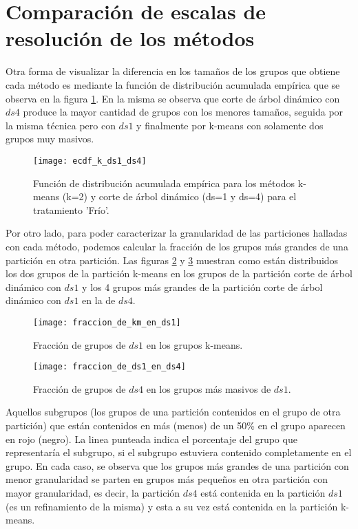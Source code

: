 \section{Comparación de escalas de resolución de los métodos}
Otra forma de visualizar la diferencia en los tamaños de los grupos que obtiene cada método es mediante la función de distribución acumulada empírica que se observa en la figura \ref{fig:ecdf_k_ds1_ds4}. En la misma se observa que corte de árbol dinámico con $ds4$ produce la mayor cantidad de grupos con los menores tamaños, seguida por la misma técnica pero con $ds1$ y finalmente por k-means con solamente dos grupos muy masivos.
\begin{figure}[h]
    \centering
    \texttt{[image: ecdf\_k\_ds1\_ds4]}
    \caption{Función de distribución acumulada empírica para los métodos k-means (k=2) y corte de árbol dinámico (ds=1 y ds=4) para el tratamiento 'Frío'.}
    \label{fig:ecdf_k_ds1_ds4}
\end{figure}
Por otro lado, para poder caracterizar la granularidad de las particiones halladas con cada método, podemos calcular la fracción de los grupos más grandes de una partición en otra partición. Las figuras \ref{fig:fraccion_de_km_en_ds1} y \ref{fig:fraccion_de_ds1_en_ds4} muestran como están distribuidos los dos grupos de la partición k-means en los grupos de la partición corte de árbol dinámico con $ds1$ y los 4 grupos más grandes de la partición corte de árbol dinámico con $ds1$ en la de $ds4$.
\begin{figure*}[t!]
    \centering
    \begin{subfigure}[t]{0.5\textwidth}
    \centering
    \texttt{[image: fraccion\_de\_km\_en\_ds1]}
    \caption{Fracción de grupos de $ds1$ en los grupos k-means.}
    \label{fig:fraccion_de_km_en_ds1}
    \end{subfigure}

    \begin{subfigure}[t]{0.8\textwidth}
    \centering
    \texttt{[image: fraccion\_de\_ds1\_en\_ds4]}
    \caption{Fracción de grupos de $ds4$ en los grupos más masivos de $ds1$.}
    \label{fig:fraccion_de_ds1_en_ds4}
    \end{subfigure}
    \caption{Fracción de grupos de una partición más fina dentro de grupos en una partición más gruesa para el tratamiento 'Frío', con $ds1$, $ds4$ y k-means. En rojo, aquellos subgrupos que están contenidos en más de un 50\% en el grupo. La linea punteada marca el porcentaje del grupo que representa el total del subgrupo.}
\end{figure*}
Aquellos subgrupos (los grupos de una partición contenidos en el grupo de otra partición) que están contenidos en más (menos) de un 50\% en el grupo aparecen en rojo (negro). La linea punteada indica el porcentaje del grupo que representaría el subgrupo, si el subgrupo estuviera contenido completamente en el grupo.
En cada caso, se observa que los grupos más grandes de una partición con menor granularidad se parten en grupos más pequeños en otra partición con mayor granularidad, es decir, la partición $ds4$ está contenida en la partición $ds1$ (es un refinamiento de la misma) y esta a su vez está contenida en la partición k-means.\\
